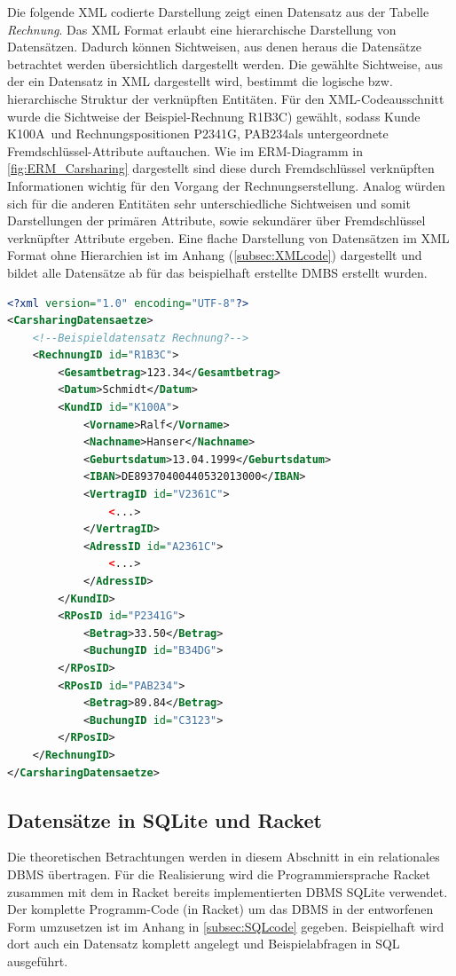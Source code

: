 Die folgende XML codierte Darstellung zeigt einen Datensatz aus der Tabelle \textit{Rechnung}. Das XML Format erlaubt eine hierarchische Darstellung von Datensätzen. Dadurch können Sichtweisen, aus denen heraus die Datensätze betrachtet werden übersichtlich dargestellt werden. Die gewählte Sichtweise, aus der ein Datensatz in XML dargestellt wird, bestimmt die logische bzw. hierarchische Struktur der verknüpften Entitäten. Für den XML-Codeausschnitt wurde die Sichtweise der Beispiel-Rechnung \glqq R1B3C\grqq) gewählt, sodass Kunde \glqq K100A\grqq\ und Rechnungspositionen \glqq P2341G\grqq, \glqq PAB234\grqq als untergeordnete Fremdschlüssel-Attribute auftauchen. Wie im ERM-Diagramm in \autoref{fig:ERM_Carsharing} dargestellt sind diese durch Fremdschlüssel verknüpften Informationen wichtig für den Vorgang der Rechnungserstellung. Analog würden sich für die anderen Entitäten sehr unterschiedliche Sichtweisen und somit Darstellungen der primären Attribute, sowie sekundärer über Fremdschlüssel verknüpfter Attribute ergeben. Eine flache Darstellung von Datensätzen im XML Format ohne Hierarchien ist im Anhang (\autoref{subsec:XMLcode}) dargestellt und bildet alle Datensätze ab für das beispielhaft erstellte DMBS erstellt wurden.

\begin{lstlisting}[language=XML]
<?xml version="1.0" encoding="UTF-8"?>
<CarsharingDatensaetze>
    <!--Beispieldatensatz Rechnung?-->
    <RechnungID id="R1B3C">
        <Gesamtbetrag>123.34</Gesamtbetrag>
        <Datum>Schmidt</Datum>
        <KundID id="K100A">
            <Vorname>Ralf</Vorname>
            <Nachname>Hanser</Nachname>
            <Geburtsdatum>13.04.1999</Geburtsdatum>
            <IBAN>DE89370400440532013000</IBAN>
            <VertragID id="V2361C">
                <...>
            </VertragID>
            <AdressID id="A2361C">
                <...>
            </AdressID>
        </KundID>
        <RPosID id="P2341G">
            <Betrag>33.50</Betrag>
            <BuchungID id="B34DG">
        </RPosID>
        <RPosID id="PAB234">
            <Betrag>89.84</Betrag>
            <BuchungID id="C3123">
        </RPosID>
    </RechnungID>
</CarsharingDatensaetze>
\end{lstlisting}


\subsection{Datensätze in SQLite und Racket}
Die theoretischen Betrachtungen werden in diesem Abschnitt in ein relationales DBMS übertragen. Für die Realisierung wird die Programmiersprache Racket zusammen mit dem in Racket bereits implementierten DBMS SQLite verwendet. Der komplette Programm-Code (in Racket) um das DBMS in der entworfenen Form umzusetzen ist im Anhang in \autoref{subsec:SQLcode} gegeben. Beispielhaft wird dort auch ein Datensatz komplett angelegt und Beispielabfragen in SQL ausgeführt.

